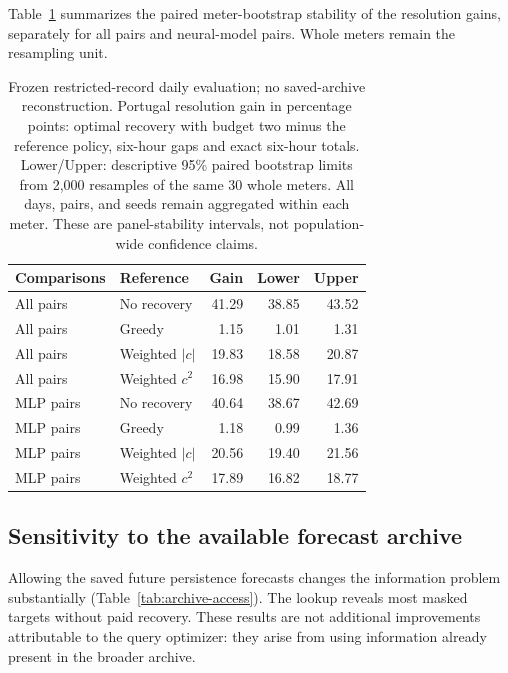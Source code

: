 \documentclass[12pt]{article}
\begin{document}
Table~\ref{tab:recoveryci} summarizes the paired meter-bootstrap
stability of the resolution gains, separately for all pairs and neural-model
pairs. Whole meters remain the resampling unit.
\begin{table}[htbp]
\centering\normalsize\setlength{\tabcolsep}{4pt}
\caption{Frozen restricted-record daily evaluation; no saved-archive reconstruction. Portugal resolution gain in percentage points: optimal recovery with budget two minus the reference policy, six-hour gaps and exact six-hour totals. Lower/Upper: descriptive 95\% paired bootstrap limits from 2,000 resamples of the same 30 whole meters. All days, pairs, and seeds remain aggregated within each meter. These are panel-stability intervals, not population-wide confidence claims.}
\label{tab:recoveryci}
\begin{tabular}{llrrr}
\toprule
Comparisons & Reference & Gain & Lower & Upper\\
\midrule
All pairs & No recovery & 41.29 & 38.85 & 43.52\\
All pairs & Greedy & 1.15 & 1.01 & 1.31\\
All pairs & Weighted $|c|$ & 19.83 & 18.58 & 20.87\\
All pairs & Weighted $c^2$ & 16.98 & 15.90 & 17.91\\
MLP pairs & No recovery & 40.64 & 38.67 & 42.69\\
MLP pairs & Greedy & 1.18 & 0.99 & 1.36\\
MLP pairs & Weighted $|c|$ & 20.56 & 19.40 & 21.56\\
MLP pairs & Weighted $c^2$ & 17.89 & 16.82 & 18.77\\
\bottomrule
\end{tabular}
\end{table}
\FloatBarrier

\subsection{Sensitivity to the available forecast archive}\label{app:earlier-access}\label{sec:archive-access}
Allowing the saved future persistence forecasts changes the information
problem substantially (Table~\ref{tab:archive-access}). The lookup reveals
most masked targets without paid recovery. These results are not additional
improvements attributable to the query optimizer: they arise from using
information already present in the broader archive.
\end{document}
